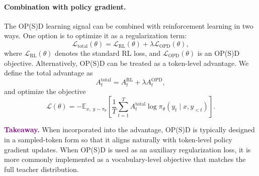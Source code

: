 









\paragraph{Combination with policy gradient.}
The OP(S)D learning signal can be combined with reinforcement learning in two ways. One option is to optimize it as a regularization term:
\[
\mathcal{L}_{\mathrm{total}}(\theta)
=
\mathcal{L}_{\mathrm{RL}}(\theta)
+
\lambda \mathcal{L}_{\mathrm{OPD}}(\theta),
\]
where \(\mathcal{L}_{\mathrm{RL}}(\theta)\) denotes the standard RL loss, and \(\mathcal{L}_{\mathrm{OPD}}(\theta)\) is an OP(S)D objective. Alternatively, OP(S)D can be treated as a token-level advantage. We define the total advantage as
\[
A_t^{\mathrm{total}}
=
A_t^{\mathrm{RL}}
+
\lambda A_t^{\mathrm{OPD}},
\]
and optimize the objective
\[
\mathcal{L}(\theta)
=
-
\mathbb{E}_{x,\;y\sim\pi_\theta}
\left[
\frac{1}{T}\sum_{t=1}^T
A_t^{\mathrm{total}}
\log \pi_\theta(y_t\mid x,y_{<t})
\right].
\]

\noindent\textcolor{purple}{\textbf{Takeaway.}}
When incorporated into the advantage, OP(S)D is typically designed in a sampled-token form so that it aligns naturally with token-level policy gradient updates. When OP(S)D is used as an auxiliary regularization loss, it is more commonly implemented as a vocabulary-level objective that matches the full teacher distribution.






